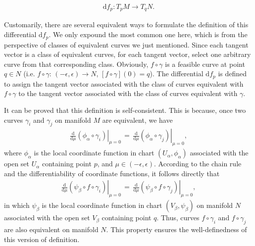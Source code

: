 \begin{equation}
    \begin{split}
        \mathrm{d}f_{p}:T_{p}M\rightarrow T_{q}N.
    \end{split}
\end{equation}
\par Customarily, there are several equivalent ways to formulate the definition of this differential $\mathrm{d}f_{p}$. We only expound the most common one here, which is from the perspective of classes of equivalent curves we just mentioned. Since each tangent vector is a class of equivalent curves, for each tangent vector, select one arbitrary curve from that corresponding class. Obviously, $f\circ\gamma$ is a feasible curve at point $q\in N$ (i.e. $f\circ\gamma:\,\left(-\epsilon,\epsilon\right)\rightarrow N$, $[f\circ\gamma]\left(0\right)=q$). The differential $\mathrm{d}f_{p}$ is defined to assign the tangent vector associated with the class of curves equivalent with $f\circ\gamma$ to the tangent vector associated with the class of curves equivalent with $\gamma$. 
\par It can be proved that this definition is self-consistent. This is because, once two curves $\gamma_{i}$ and $\gamma_{j}$ on manifold $M$ are equivalent, we have
\begin{equation}
    \begin{split}
        \left.\frac{\mathrm{d}}{\mathrm{d}\mu}\left(\phi_{\alpha}\circ\gamma_{i}\right)\right|_{\mu=0}\,=\,\left.\frac{\mathrm{d}}{\mathrm{d}\mu}\left(\phi_{\alpha}\circ\gamma_{j}\right)\right|_{\mu=0},
    \end{split}
\end{equation}
where $\phi_{\alpha}$ is the local coordinate function in chart $\left(U_{\alpha},\phi_{\alpha}\right)$ associated with the open set $U_{\alpha}$ containing point $p$, and $\mu\in\left(-\epsilon,\epsilon\right)$. According to the chain rule and the differentiability of coordinate functions, it follows directly that
\begin{equation}
    \begin{split}
        \left.\frac{\mathrm{d}}{\mathrm{d}\mu}\left(\psi_{\beta}\circ f\circ\gamma_{i}\right)\right|_{\mu=0}\,=\,\left.\frac{\mathrm{d}}{\mathrm{d}\mu}\left(\psi_{\beta}\circ f\circ\gamma_{j}\right)\right|_{\mu=0},
    \end{split}
\end{equation}
in which $\psi_{\beta}$ is the local coordinate function in chart $\left(V_{\beta},\psi_{\beta}\right)$ on manifold $N$ associated with the open set $V_{\beta}$ containing point $q$. Thus, curves $f\circ\gamma_{i}$ and $f\circ\gamma_{j}$ are also equivalent on manifold $N$. This property ensures the well-definedness of this version of definition. 
